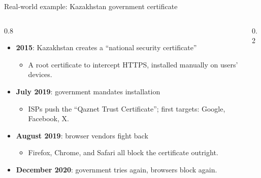 \ifdefined\PRESENTATION\else\PassOptionsToClass{handout}{beamer}\fi\documentclass[aspectratio=169, lualatex]{beamer}
\begin{document}
\begin{frame}{Real-world example: Kazakhstan government certificate}
	\begin{columns}[c]
		\begin{column}{0.8\textwidth}
			\begin{itemize}[<+->]
				\item \textbf{2015}: Kazakhstan creates a ``national security certificate''
				      \begin{itemize}
					      \item A root certificate to intercept HTTPS, installed manually on users' devices.
				      \end{itemize}
				\item \textbf{July 2019}: government mandates installation
				      \begin{itemize}
					      \item ISPs push the ``Qaznet Trust Certificate''; first targets: Google, Facebook, X.
				      \end{itemize}
				\item \textbf{August 2019}: browser vendors fight back
				      \begin{itemize}
					      \item Firefox, Chrome, and Safari all block the certificate outright.
				      \end{itemize}
				\item \textbf{December 2020}: government tries again, browsers block again.
			\end{itemize}
		\end{column}
		\begin{column}{0.2\textwidth}
		\end{column}
	\end{columns}
\end{frame}
\end{document}
